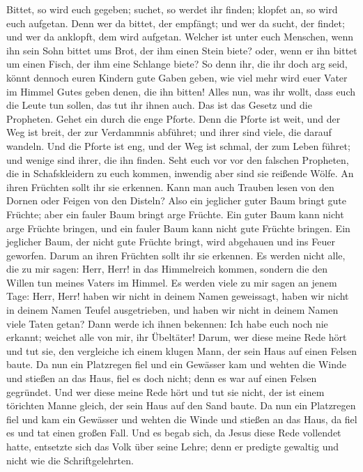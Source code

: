  Bittet, so wird euch gegeben; suchet, so werdet ihr
finden; klopfet an, so wird euch aufgetan.  Denn wer da
bittet, der empfängt; und wer da sucht, der findet; und wer da anklopft,
dem wird aufgetan.  Welcher ist unter euch Menschen, wenn
ihn sein Sohn bittet ums Brot, der ihm einen Stein biete?
 oder, wenn er ihn bittet um einen Fisch, der ihm eine
Schlange biete?  So denn ihr, die ihr doch arg seid,
könnt dennoch euren Kindern gute Gaben geben, wie viel mehr wird euer
Vater im Himmel Gutes geben denen, die ihn bitten!  Alles
nun, was ihr wollt, dass euch die Leute tun sollen, das tut ihr ihnen
auch. Das ist das Gesetz und die Propheten.  Gehet ein
durch die enge Pforte. Denn die Pforte ist weit, und der Weg ist breit,
der zur Verdammnis abführet; und ihrer sind viele, die darauf wandeln.
 Und die Pforte ist eng, und der Weg ist schmal, der zum
Leben führet; und wenige sind ihrer, die ihn finden. 
Seht euch vor vor den falschen Propheten, die in Schafskleidern zu euch
kommen, inwendig aber sind sie reißende Wölfe.  An ihren
Früchten sollt ihr sie erkennen. Kann man auch Trauben lesen von den
Dornen oder Feigen von den Disteln?  Also ein jeglicher
guter Baum bringt gute Früchte; aber ein fauler Baum bringt arge
Früchte.  Ein guter Baum kann nicht arge Früchte bringen,
und ein fauler Baum kann nicht gute Früchte bringen.  Ein
jeglicher Baum, der nicht gute Früchte bringt, wird abgehauen und ins
Feuer geworfen.  Darum an ihren Früchten sollt ihr sie
erkennen.  Es werden nicht alle, die zu mir sagen: Herr,
Herr! in das Himmelreich kommen, sondern die den Willen tun meines
Vaters im Himmel.  Es werden viele zu mir sagen an jenem
Tage: Herr, Herr! haben wir nicht in deinem Namen geweissagt, haben wir
nicht in deinem Namen Teufel ausgetrieben, und haben wir nicht in deinem
Namen viele Taten getan?  Dann werde ich ihnen bekennen:
Ich habe euch noch nie erkannt; weichet alle von mir, ihr Übeltäter!
 Darum, wer diese meine Rede hört und tut sie, den
vergleiche ich einem klugen Mann, der sein Haus auf einen Felsen baute.
 Da nun ein Platzregen fiel und ein Gewässer kam und
wehten die Winde und stießen an das Haus, fiel es doch nicht; denn es
war auf einen Felsen gegründet.  Und wer diese meine Rede
hört und tut sie nicht, der ist einem törichten Manne gleich, der sein
Haus auf den Sand baute.  Da nun ein Platzregen fiel und
kam ein Gewässer und wehten die Winde und stießen an das Haus, da fiel
es und tat einen großen Fall.  Und es begab sich, da
Jesus diese Rede vollendet hatte, entsetzte sich das Volk über seine
Lehre;  denn er predigte gewaltig und nicht wie die
Schriftgelehrten.

